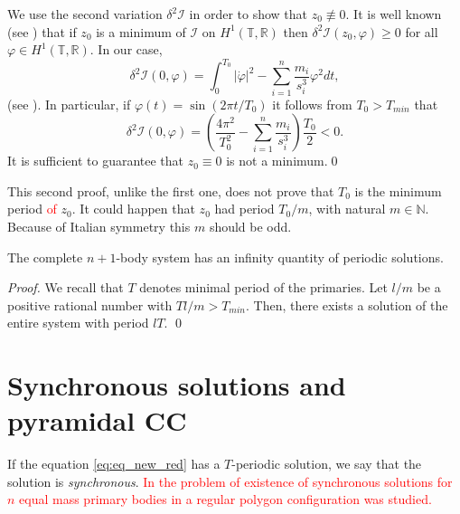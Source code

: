\documentclass[smallcondensed]{svjour3}
\newcommand{\rr}{\mathbb{R}}
\begin{document}
\begin{remark}
We use the second variation $\delta^2 \mathcal{I}$ in order to show  that $z_0\nequiv 0$. It is well known (see \cite[Th. 1.3.1]{jost1998calculus}) that if $z_0$ is a minimum of $\mathcal{I}$ on $H^1(\mathbb{T},\rr)$  then $\delta^2 \mathcal{I} (z_0,\varphi)\geq 0$ for all $\varphi\in H^1(\mathbb{T},\rr)$. In our case,
\[\delta^2\mathcal{I}(0,\varphi)=\int_0^{T_0} |\dot{\varphi}|^2-\sum_{i=1}^{n}\frac{m_i}{s_i^3}\varphi^2 dt,\]
(see \cite[Eq. 1.3.6]{jost1998calculus}). In particular, if $\varphi(t)=\sin (2\pi t/T_0)$ it follows from $T_0>T_{min}$  that
\begin{equation}\label{eq:form.delta2}
 \delta^2 \mathcal{I} (0,\varphi)=\left( \frac{4\pi^2}{T_0^2}-\sum_{i=1}^{n}\frac{m_i}{s_i^3} \right)\frac{T_0}{2}<0.
\end{equation}
It is sufficient  to guarantee that $z_0\equiv 0$ is not a minimum.\qed


This second proof, unlike the first one, does not prove that $T_0$ is the minimum period \textcolor{red}{of} $z_0$. It could happen that $z_0$ had period $T_0/m$, with natural $m\in\mathbb{N}$. Because of Italian symmetry this $m$ should be odd.
\end{remark}






\begin{corollary}\label{cor:sol.periodica.sist.completo}
The complete $n+1$-body system has an infinity quantity of periodic solutions.
\end{corollary}
\begin{proof} We recall that $T$ denotes minimal period of the primaries.
Let $l/m$  be a positive rational number with $Tl/m>T_{min}$. Then, there exists a solution of the entire system with period $lT$.
\qed\end{proof}





\section{Synchronous solutions and pyramidal CC}\label{sec:sincro}



If the equation \eqref{eq:eq_new_red} has a $T$-periodic solution,  we say that the solution is \emph{synchronous}. \textcolor{red}{In \cite{li2013characterization} the problem of existence of synchronous solutions for $n$ equal mass primary bodies in a regular polygon configuration  was studied.}
\end{document}
